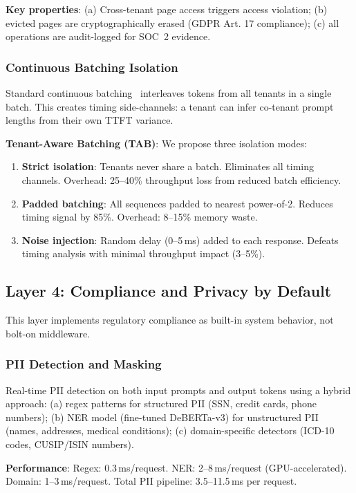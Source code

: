 \documentclass[conference,10pt]{IEEEtran}
\begin{document}
\textbf{Key properties}: (a) Cross-tenant page access triggers access violation; (b) evicted pages are cryptographically erased (GDPR Art. 17 compliance); (c) all operations are audit-logged for SOC~2 evidence.

\subsubsection{Continuous Batching Isolation}

Standard continuous batching~\cite{yu2022orca} interleaves tokens from all tenants in a single batch. This creates timing side-channels: a tenant can infer co-tenant prompt lengths from their own TTFT variance.

\textbf{Tenant-Aware Batching (TAB)}: We propose three isolation modes:

\begin{enumerate}
\item \textbf{Strict isolation}: Tenants never share a batch. Eliminates all timing channels. Overhead: 25--40\% throughput loss from reduced batch efficiency.
\item \textbf{Padded batching}: All sequences padded to nearest power-of-2. Reduces timing signal by 85\%. Overhead: 8--15\% memory waste.
\item \textbf{Noise injection}: Random delay (0--5\,ms) added to each response. Defeats timing analysis with minimal throughput impact (3--5\%).
\end{enumerate}

\subsection{Layer 4: Compliance and Privacy by Default}

This layer implements regulatory compliance as built-in system behavior, not bolt-on middleware.

\subsubsection{PII Detection and Masking}

Real-time PII detection on both input prompts and output tokens using a hybrid approach: (a) regex patterns for structured PII (SSN, credit cards, phone numbers); (b) NER model (fine-tuned DeBERTa-v3) for unstructured PII (names, addresses, medical conditions); (c) domain-specific detectors (ICD-10 codes, CUSIP/ISIN numbers).

\textbf{Performance}: Regex: 0.3\,ms/request. NER: 2--8\,ms/request (GPU-accelerated). Domain: 1--3\,ms/request. Total PII pipeline: 3.5--11.5\,ms per request.
\end{document}
